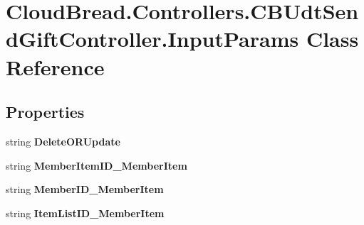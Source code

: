 \hypertarget{class_cloud_bread_1_1_controllers_1_1_c_b_udt_send_gift_controller_1_1_input_params}{}\section{Cloud\+Bread.\+Controllers.\+C\+B\+Udt\+Send\+Gift\+Controller.\+Input\+Params Class Reference}
\label{class_cloud_bread_1_1_controllers_1_1_c_b_udt_send_gift_controller_1_1_input_params}
\subsection*{Properties}
\begin{DoxyCompactItemize}
\item 
string {\bfseries Delete\+O\+R\+Update}\hypertarget{class_cloud_bread_1_1_controllers_1_1_c_b_udt_send_gift_controller_1_1_input_params_a48e14d1db508ef473eabb83c02664002}{}\label{class_cloud_bread_1_1_controllers_1_1_c_b_udt_send_gift_controller_1_1_input_params_a48e14d1db508ef473eabb83c02664002}

\item 
string {\bfseries Member\+Item\+I\+D\+\_\+\+Member\+Item}\hypertarget{class_cloud_bread_1_1_controllers_1_1_c_b_udt_send_gift_controller_1_1_input_params_a0f37d462eb2b25f4729dd765cefb00c5}{}\label{class_cloud_bread_1_1_controllers_1_1_c_b_udt_send_gift_controller_1_1_input_params_a0f37d462eb2b25f4729dd765cefb00c5}

\item 
string {\bfseries Member\+I\+D\+\_\+\+Member\+Item}\hypertarget{class_cloud_bread_1_1_controllers_1_1_c_b_udt_send_gift_controller_1_1_input_params_ab83c0b39c4d2cb9f2f845bc5c6e3d9e8}{}\label{class_cloud_bread_1_1_controllers_1_1_c_b_udt_send_gift_controller_1_1_input_params_ab83c0b39c4d2cb9f2f845bc5c6e3d9e8}

\item 
string {\bfseries Item\+List\+I\+D\+\_\+\+Member\+Item}\hypertarget{class_cloud_bread_1_1_controllers_1_1_c_b_udt_send_gift_controller_1_1_input_params_a9860cf674593ea6547687995dae6bba9}{}\label{class_cloud_bread_1_1_controllers_1_1_c_b_udt_send_gift_controller_1_1_input_params_a9860cf674593ea6547687995dae6bba9}


\end{DoxyCompactItemize}

